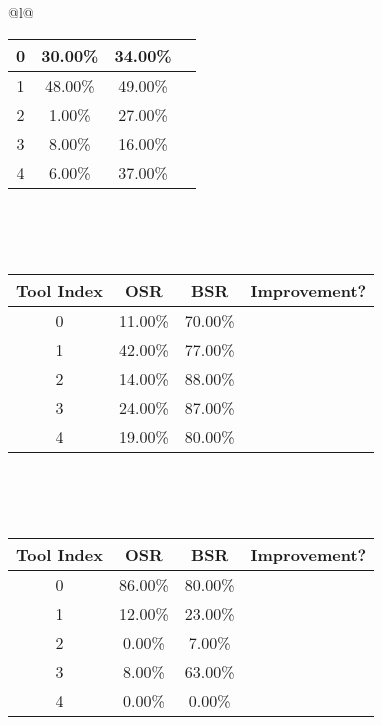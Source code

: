 \begin{longtable}{@{}l@{}}
\begin{minipage}{\textwidth}
\begin{tabular}{|c|c|c|c|}
0 & 30.00\% & 34.00\% & \textcolor{green}{\ding{51}} \\ \hline
1 & 48.00\% & 49.00\% & \textcolor{green}{\ding{51}} \\ \hline
2 & 1.00\% & 27.00\% & \textcolor{green}{\ding{51}} \\ \hline
3 & 8.00\% & 16.00\% & \textcolor{green}{\ding{51}} \\ \hline
4 & 6.00\% & 37.00\% & \textcolor{green}{\ding{51}} \\ \hline
\end{tabular}
\end{minipage}\\[2ex]
\begin{minipage}{\textwidth}
\centering\vspace{2ex}
\\[0.8ex]
\begin{tabular}{|c|c|c|c|} \hline
\textbf{Tool Index} & \textbf{OSR} & \textbf{ BSR} & \textbf{Improvement?} \\ \hline
0 & 11.00\% & 70.00\% & \textcolor{green}{\ding{51}} \\ \hline
1 & 42.00\% & 77.00\% & \textcolor{green}{\ding{51}} \\ \hline
2 & 14.00\% & 88.00\% & \textcolor{green}{\ding{51}} \\ \hline
3 & 24.00\% & 87.00\% & \textcolor{green}{\ding{51}} \\ \hline
4 & 19.00\% & 80.00\% & \textcolor{green}{\ding{51}} \\ \hline
\end{tabular}
\end{minipage}\\[2ex]
\begin{minipage}{\textwidth}
\centering\vspace{2ex}
\\[0.8ex]
\begin{tabular}{|c|c|c|c|} \hline
\textbf{Tool Index} & \textbf{OSR} & \textbf{ BSR} & \textbf{Improvement?} \\ \hline
0 & 86.00\% & 80.00\% & \textcolor{red}{\ding{55}} \\ \hline
1 & 12.00\% & 23.00\% & \textcolor{green}{\ding{51}} \\ \hline
2 & 0.00\% & 7.00\% & \textcolor{green}{\ding{51}} \\ \hline
3 & 8.00\% & 63.00\% & \textcolor{green}{\ding{51}} \\ \hline
4 & 0.00\% & 0.00\% & \textcolor{red}{\ding{55}} \\ \hline

\end{tabular}
\end{minipage}
\end{longtable}
